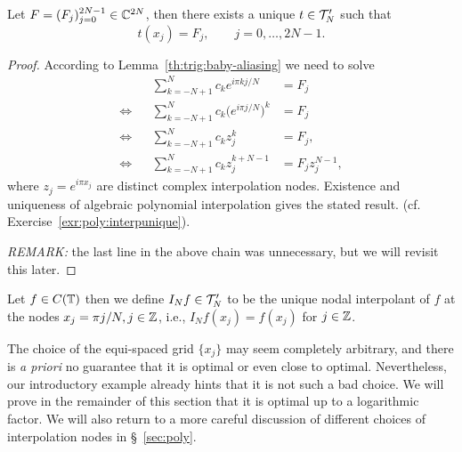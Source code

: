 \begin{lemma}
  Let $F  = (F_j)_{j = 0}^{2N-1} \in \mathbb{C}^{2N}$, then there exists a unique 
  $t \in \mathcal{T}_N'$ such that 
  \[
    t(x_j) = F_j, \qquad j = 0, \dots, 2N-1.
  \]
\end{lemma}
\begin{proof}
  According to Lemma~\ref{th:trig:baby-aliasing} we need to solve 
  \begin{align*}
      && \sum_{k = -N+1}^N c_k e^{i\pi k j/N} &= F_j \\ 
      \Leftrightarrow &&
      \sum_{k = -N+1}^N c_k \big(e^{i\pi j/N}\big)^k &= F_j \\ 
      \Leftrightarrow &&
      \sum_{k = -N+1}^N c_k z_j^k &= F_j, \\ 
      \Leftrightarrow &&
      \sum_{k = -N+1}^N c_k z_j^{k+N-1} &= F_j z_j^{N-1},
  \end{align*}
  where $z_j = e^{i\pi x_j}$ are distinct complex interpolation nodes. Existence
  and uniqueness of algebraic polynomial interpolation gives the stated result.
  (cf. Exercise~\ref{exr:poly:interpunique}).

  {\it REMARK: } the last line in the above chain was unnecessary, but we will 
  revisit this later.
\end{proof}

\medskip 

\begin{definition}
  Let $f \in C(\mathbb{T})$ then we define $I_N f \in \mathcal{T}_N'$ to be the unique nodal
  interpolant of $f$ at the nodes $x_j = \pi j / N, j \in \mathbb{Z}$, i.e., $I_N f(x_j)
  = f(x_j)$ for $j \in \mathbb{Z}$.
\end{definition}

\medskip 

\begin{remark} 
  The choice of the equi-spaced grid $\{x_j\}$ may seem completely arbitrary,
  and there is {\it a priori} no guarantee that it is optimal or even close to
  optimal. Nevertheless, our introductory example already hints that it is not
  such a bad choice. We will prove in the remainder of this section that it is
  optimal up to a logarithmic factor. We will also return to a more careful
  discussion of different choices of interpolation nodes in \S~\ref{sec:poly}.
\end{remark}


